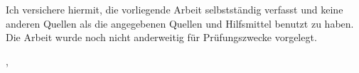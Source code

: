 
\thispagestyle{empty}
\vspace*{0.8\textheight}
\noindent

Ich versichere hiermit, die vorliegende Arbeit selbstständig verfasst und keine anderen Quellen als die angegebenen Quellen und Hilfsmittel benutzt zu haben. Die Arbeit wurde noch nicht anderweitig für Prüfungszwecke vorgelegt.

\vspace{5mm}
\noindent
\getSubmissionLocation{}, \getSubmissionDate{} \hspace{5cm} \getAuthor{}

\cleardoublepage{}
